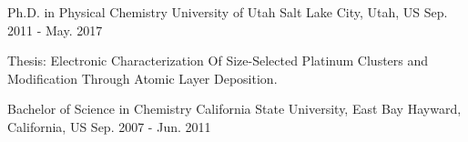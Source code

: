 


\begin{cventries}


\cventry
{Ph.D. in Physical Chemistry}
{University of Utah}
{Salt Lake City, Utah, US}
{Sep. 2011 - May. 2017}
{
\begin{cvitems}
\item {Thesis: Electronic Characterization Of Size-Selected Platinum Clusters
    and Modification Through Atomic Layer Deposition.}
\end{cvitems}
}

\cventry
{Bachelor of Science in Chemistry}
{California State University, East Bay}
{Hayward, California, US}
{Sep. 2007 - Jun. 2011}
{
}


\end{cventries}
